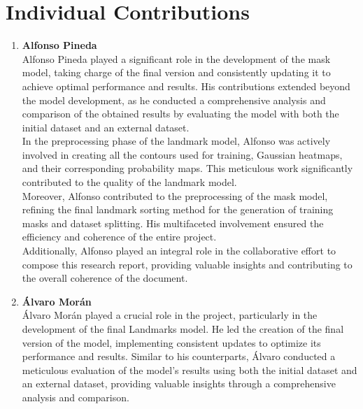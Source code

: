 \documentclass[runningheads]{llncs}
\begin{document}
\section{Individual Contributions}
\begin{enumerate}
    \item \textbf{Alfonso Pineda} \\
    
    Alfonso Pineda played a significant role in the development of the mask model, taking charge of the final version and consistently updating it to achieve optimal performance and results. His contributions extended beyond the model development, as he conducted a comprehensive analysis and comparison of the obtained results by evaluating the model with both the initial dataset and an external dataset.\\

    In the preprocessing phase of the landmark model, Alfonso was actively involved in creating all the contours used for training, Gaussian heatmaps, and their corresponding probability maps. This meticulous work significantly contributed to the quality of the landmark model.\\
    
    Moreover, Alfonso contributed to the preprocessing of the mask model, refining the final landmark sorting method for the generation of training masks and dataset splitting. His multifaceted involvement ensured the efficiency and coherence of the entire project.\\
    
    Additionally, Alfonso played an integral role in the collaborative effort to compose this research report, providing valuable insights and contributing to the overall coherence of the document. \\
    
    \item \textbf{Álvaro Morán} \\
    
    Álvaro Morán played a crucial role in the project, particularly in the development of the final Landmarks model. He led the creation of the final version of the model, implementing consistent updates to optimize its performance and results. Similar to his counterparts, Álvaro conducted a meticulous evaluation of the model's results using both the initial dataset and an external dataset, providing valuable insights through a comprehensive analysis and comparison.\\


\end{enumerate}
\end{document}

